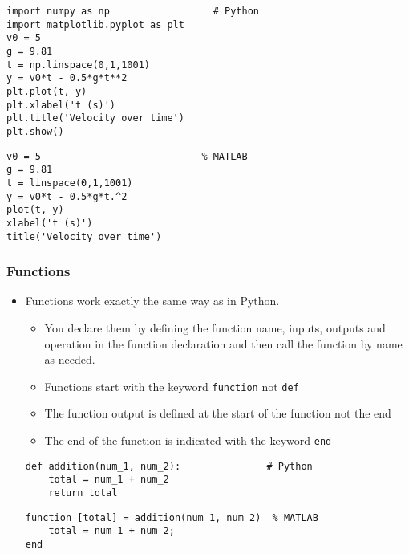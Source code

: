 \documentclass[english,14pt]{beamer}
\begin{document}

\begin{frame}[fragile]
\begin{lstlisting}[style=CStyle]
import numpy as np                  # Python
import matplotlib.pyplot as plt
v0 = 5
g = 9.81
t = np.linspace(0,1,1001) 
y = v0*t - 0.5*g*t**2
plt.plot(t, y)
plt.xlabel('t (s)')
plt.title('Velocity over time')
plt.show()
\end{lstlisting}
\begin{lstlisting}[style=MStyle]
v0 = 5                            % MATLAB
g = 9.81
t = linspace(0,1,1001)   
y = v0*t - 0.5*g*t.^2
plot(t, y)
xlabel('t (s)')
title('Velocity over time')
\end{lstlisting}
\end{frame}


\begin{frame}[fragile]
\frametitle{Functions}
\begin{itemize}
\item Functions work exactly the same way as in Python. 
    \begin{itemize}
        \item You declare them by defining the function name, inputs, outputs and operation in the function declaration and then call the function by name as needed.

        \item Functions start with the keyword \texttt{function} not \texttt{def}
        \item The function output is defined at the start of the function not the end
        \item The end of the function is indicated with the keyword \texttt{end}
    \end{itemize}
\begin{lstlisting}[style=CStyle]
def addition(num_1, num_2):               # Python
    total = num_1 + num_2
    return total
\end{lstlisting}
\begin{lstlisting}[style=MStyle]
function [total] = addition(num_1, num_2)  % MATLAB
    total = num_1 + num_2;
end
\end{lstlisting}
\end{itemize}
\end{frame}





\end{document}
